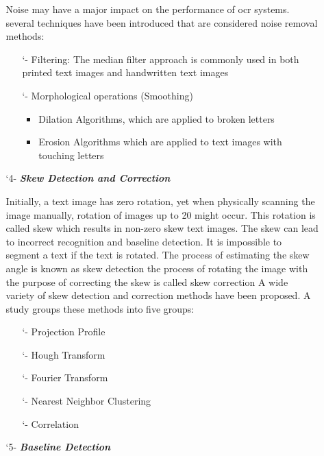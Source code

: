 \begin{itemize}[labelindent=1em,labelsep=0.25cm,leftmargin=*]
\begin{itemize}[labelindent=1em,labelsep=0.25cm,leftmargin=*]
        Noise may have a major impact on the performance of \acrshort{ocr} systems. several techniques have been introduced that are considered noise removal methods:
        \begin{itemize}[itemsep=1pt, topsep=5pt]
        \item[\char `-] Filtering: The median filter approach is commonly used in both printed text images and handwritten text images
        \item[\char `-] Morphological operations (Smoothing)
            \begin{itemize}[itemsep=1pt, topsep=5pt]
            \item Dilation Algorithms, which are applied to broken letters
            \item Erosion Algorithms which are applied to text images with touching letters  
        \end{itemize} 
    \end{itemize} 
       
        \item[\char `4-] \textit{\textbf{Skew Detection and Correction}}
        
        Initially, a text image has zero rotation, yet when physically scanning the image manually, rotation of images up to 20 might occur. This rotation is called skew which results in non-zero skew text images.
        The skew can lead to incorrect recognition and baseline detection.
        It is impossible to segment a text if the text is rotated.
        The process of estimating the skew angle is known as skew detection
        the process of rotating the image with the purpose of correcting the skew is called skew correction
        A wide variety of skew detection and correction methods have been proposed. 
        A study groups these methods into five groups:
        \begin{itemize}[itemsep=1pt, topsep=5pt]
        \item[\char `-] Projection Profile
        \item[\char `-] Hough Transform
        \item[\char `-] Fourier Transform
        \item[\char `-] Nearest Neighbor Clustering 
        \item[\char `-] Correlation
        \end{itemize} 
        \item[\char `5-] \textit{\textbf{Baseline Detection}}
        

\end{itemize}
\end{itemize}
